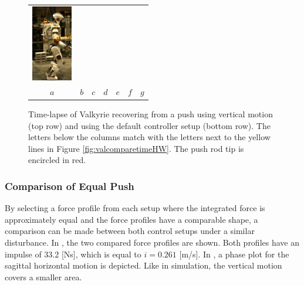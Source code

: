 \begin{figure}
\begin{tabular}{ccccccc}
    \includegraphics[width=0.7in]{STYLESTUFF/val7d_30} \\
    $a$&
    $b$&
    $c$&
    $d$&
    $e$&
    $f$&
    $g$\\
  \end{tabular}
  \caption{Time-lapse of Valkyrie recovering from a push using vertical motion (top row) and using the default controller setup (bottom row). The letters below the columns match with the letters next to the yellow lines in Figure \ref{fig:valcomparetimeHW}. The push rod tip is encircled in red.}
  \label{fig:val}
\end{figure}

\subsubsection{Comparison of Equal Push} 
By selecting a force profile from each setup where the integrated force is approximately equal and the force profiles have a comparable shape, a comparison can be made between both control setups under a similar disturbance. In , the two compared force profiles are shown. Both profiles have an impulse of $33.2$ [Ns], which is equal to $i=0.261$ [m/s]. In , a phase plot for the sagittal horizontal motion is depicted. Like in simulation, the vertical motion covers a smaller area. 

